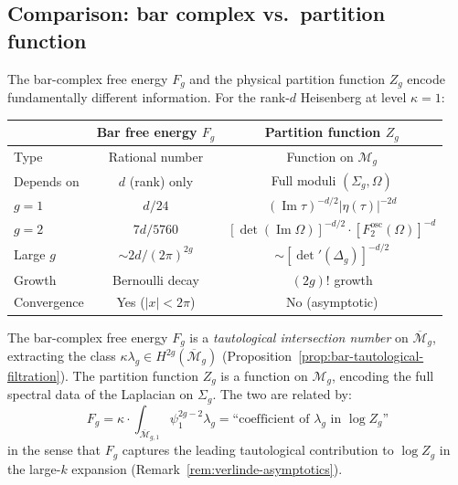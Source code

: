 \subsection{Comparison: bar complex vs.\ partition function}

\begin{remark}
\label{rem:bar-vs-partition-systematic}

The bar-complex free energy $F_g$ and the physical partition
function $Z_g$ encode fundamentally different information.
For the rank-$d$ Heisenberg at level $\kappa = 1$:

\begin{center}
\renewcommand{\arraystretch}{1.3}
\begin{tabular}{l|cc}
& Bar free energy $F_g$ & Partition function $Z_g$ \\
\hline
Type & Rational number & Function on $\mathcal{M}_g$ \\
Depends on & $d$ (rank) only & Full moduli $(\Sigma_g, \Omega)$ \\
$g = 1$ & $d/24$ & $(\operatorname{Im}\tau)^{-d/2}
|\eta(\tau)|^{-2d}$ \\
$g = 2$ & $7d/5760$ &
$[\det(\operatorname{Im}\Omega)]^{-d/2}
\cdot [F_2^{\mathrm{osc}}(\Omega)]^{-d}$ \\
Large $g$ & $\sim 2d/(2\pi)^{2g}$ &
$\sim [\det'(\Delta_g)]^{-d/2}$ \\
Growth & Bernoulli decay & $(2g)!$ growth \\
Convergence & Yes ($|x| < 2\pi$) & No (asymptotic)
\end{tabular}
\end{center}

The bar-complex free energy $F_g$ is a \emph{tautological intersection
number} on $\overline{\mathcal{M}}_g$, extracting the class
$\kappa \lambda_g \in H^{2g}(\overline{\mathcal{M}}_g)$
(Proposition~\ref{prop:bar-tautological-filtration}).
The partition function $Z_g$ is a function on $\mathcal{M}_g$,
encoding the full spectral data of the Laplacian on $\Sigma_g$.
The two are related by:
\[
F_g = \kappa \cdot \int_{\overline{\mathcal{M}}_{g,1}}
\psi_1^{2g-2} \lambda_g
= \text{``coefficient of } \lambda_g \text{ in }
\log Z_g\text{''}
\]
in the sense that $F_g$ captures the leading tautological
contribution to $\log Z_g$ in the large-$k$ expansion
(Remark~\ref{rem:verlinde-asymptotics}).
\end{remark}
